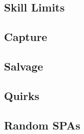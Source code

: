 

\subsection{Skill Limits}



\subsection{Capture}



\subsection{Salvage}



\subsection{Quirks}



\subsection{Random SPAs}



\newpage
